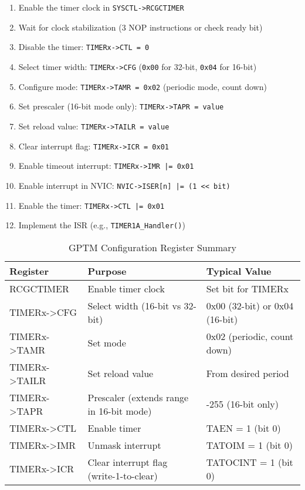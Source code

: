 \begin{enumerate}[nosep]
  \item Enable the timer clock in \texttt{SYSCTL->RCGCTIMER}
  \item Wait for clock stabilization (3 NOP instructions or check ready bit)
  \item Disable the timer: \texttt{TIMERx->CTL = 0}
  \item Select timer width: \texttt{TIMERx->CFG} (\texttt{0x00} for 32-bit, \texttt{0x04} for 16-bit)
  \item Configure mode: \texttt{TIMERx->TAMR = 0x02} (periodic mode, count down)
  \item Set prescaler (16-bit mode only): \texttt{TIMERx->TAPR = value}
  \item Set reload value: \texttt{TIMERx->TAILR = value}
  \item Clear interrupt flag: \texttt{TIMERx->ICR = 0x01}
  \item Enable timeout interrupt: \texttt{TIMERx->IMR |= 0x01}
  \item Enable interrupt in NVIC: \texttt{NVIC->ISER[n] |= (1 << bit)}
  \item Enable the timer: \texttt{TIMERx->CTL |= 0x01}
  \item Implement the ISR (e.g., \texttt{TIMER1A\_Handler()})
\end{enumerate}

\begin{table}[H]
\centering
\small
\setlength{\tabcolsep}{6pt}
\renewcommand{\arraystretch}{1.15}
\begin{tabularx}{0.98\linewidth}{>{\ttfamily}l X >{\ttfamily}l}
\toprule
\textnormal{\textbf{Register}} & \textnormal{\textbf{Purpose}} & \textnormal{\textbf{Typical Value}} \\
\midrule
RCGCTIMER      & Enable timer clock                                       & Set bit for TIMERx \\
TIMERx->CFG    & Select width (16-bit vs 32-bit)                           & 0x00 (32-bit) or 0x04 (16-bit) \\
TIMERx->TAMR   & Set mode                                                  & 0x02 (periodic, count down) \\
TIMERx->TAILR  & Set reload value                                          & From desired period \\
TIMERx->TAPR   & Prescaler (extends range in 16-bit mode)                  & 0-255 (16-bit only) \\
TIMERx->CTL    & Enable timer                                              & TAEN = 1 (bit 0) \\
TIMERx->IMR    & Unmask interrupt                                          & TATOIM = 1 (bit 0) \\
TIMERx->ICR    & Clear interrupt flag (write-1-to-clear)                   & TATOCINT = 1 (bit 0) \\
\bottomrule
\end{tabularx}
\caption{GPTM Configuration Register Summary}
\end{table}


